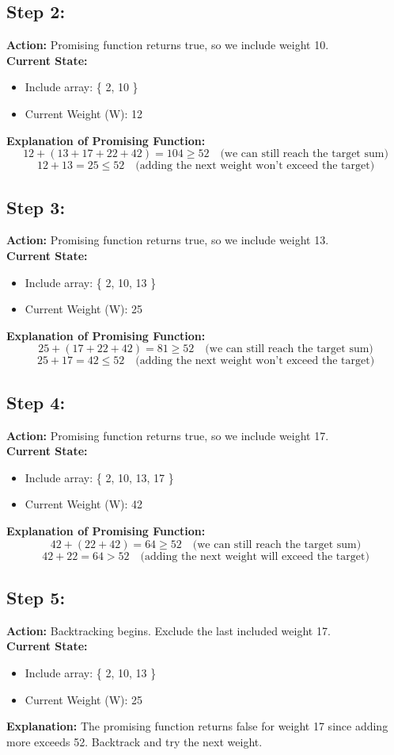 \documentclass[12pt]{article}
\begin{document}
\subsection*{Step 2:}
\textbf{Action:} Promising function returns true, so we include weight 10. \\
\textbf{Current State:} 
\begin{itemize}
    \item Include array: \{ 2, 10 \}
    \item Current Weight (W): 12
\end{itemize}
\textbf{Explanation of Promising Function:}
\[
12 + (13 + 17 + 22 + 42) = 104 \geq 52 \quad \text{(we can still reach the target sum)}
\]
\[
12 + 13 = 25 \leq 52 \quad \text{(adding the next weight won't exceed the target)}
\]

\subsection*{Step 3:}
\textbf{Action:} Promising function returns true, so we include weight 13. \\
\textbf{Current State:} 
\begin{itemize}
    \item Include array: \{ 2, 10, 13 \}
    \item Current Weight (W): 25
\end{itemize}
\textbf{Explanation of Promising Function:}
\[
25 + (17 + 22 + 42) = 81 \geq 52 \quad \text{(we can still reach the target sum)}
\]
\[
25 + 17 = 42 \leq 52 \quad \text{(adding the next weight won't exceed the target)}
\]

\subsection*{Step 4:}
\textbf{Action:} Promising function returns true, so we include weight 17. \\
\textbf{Current State:} 
\begin{itemize}
    \item Include array: \{ 2, 10, 13, 17 \}
    \item Current Weight (W): 42
\end{itemize}
\textbf{Explanation of Promising Function:}
\[
42 + (22 + 42) = 64 \geq 52 \quad \text{(we can still reach the target sum)}
\]
\[
42 + 22 = 64 > 52 \quad \text{(adding the next weight will exceed the target)}
\]

\subsection*{Step 5:}
\textbf{Action:} Backtracking begins. Exclude the last included weight 17. \\
\textbf{Current State:} 
\begin{itemize}
    \item Include array: \{ 2, 10, 13 \}
    \item Current Weight (W): 25
\end{itemize}
\textbf{Explanation:} The promising function returns false for weight 17 since adding more exceeds 52. Backtrack and try the next weight.
\end{document}
